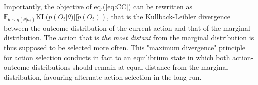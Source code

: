 \documentclass[10pt,letterpaper]{article}
\begin{document}
Importantly, the objective of eq.(\ref{eq:CC}) can be rewritten as $\mathbb{E}_{\theta\sim q(\theta|a_t)} \text{KL} ( p(O_t|\theta)|| \tilde{p}(O_t))$, that is the Kullback-Leibler divergence between the outcome distribution of the current action and that of the marginal distribution. The action that is \emph{the most distant} from the marginal distribution is thus supposed to be selected more often. This "maximum divergence" principle for action selection conducts in fact to an equilibrium state in which both action-outcome distributions should remain at equal distance from the marginal distribution, favouring alternate action selection in the long run. 








\end{document}
